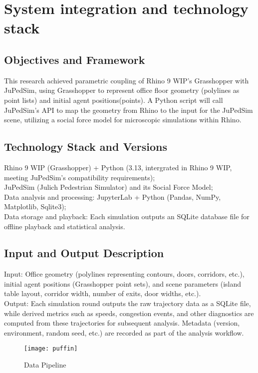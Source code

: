 \section{System integration and technology stack}

\subsection{Objectives and Framework }
This research achieved parametric coupling of Rhino 9 WIP's Grasshopper with JuPedSim, using Grasshopper to represent office floor geometry (polylines as point lists) and initial agent positions(points). A Python script will call JuPedSim's API to map the geometry from Rhino to the input for the JuPedSim scene, utilizing a social force model for microscopic simulations within Rhino. 
\subsection{Technology Stack and Versions}
Rhino 9 WIP (Grasshopper) + Python (3.13, intergrated in Rhino 9 WIP, meeting JuPedSim's compatibility requirements);
\\JuPedSim (Julich Pedestrian Simulator) and its Social Force Model; 
\\Data analysis and processing: JupyterLab + Python (Pandas, NumPy, Matplotlib, Sqlite3); 
\\Data storage and playback: Each simulation outputs an SQLite database file for offline playback and statistical analysis. 
\subsection{Input and Output Description }
Input: Office geometry (polylines representing contours, doors, corridors, etc.), initial agent positions (Grasshopper point sets), and scene parameters (island table layout, corridor width, number of exits, door widths, etc.). 
\\Output: Each simulation round outputs the raw trajectory data as a SQLite file, while derived metrics such as speeds, congestion events, and other diagnostics are computed from these trajectories for subsequent analysis. Metadata (version, environment, random seed, etc.) are recorded as part of the analysis workflow.
\begin{figure}[h]
    \centering
    \texttt{[image: puffin]}
    \caption{Data Pipeline}
    \label{fig:pipeline}
\end{figure}

